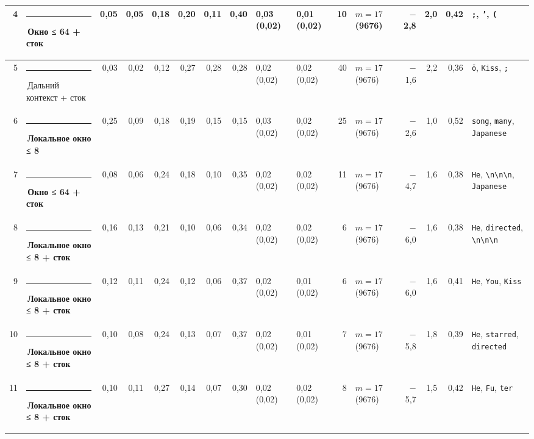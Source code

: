 \documentclass[10pt]{article}
\begin{document}
\begin{minipage}{\linewidth}
\begin{center}
{\begin{tabular}{|r|l|r|r|r|r|r|r|l|l|r|l|r|r|r|l|}
4 & \textcolor[HTML]{EDA100}{\rule{0.62em}{0.62em}}\,\textbf{Окно ≤ 64 + сток} & 0,05 & 0,05 & 0,18 & 0,20 & 0,11 & 0,40 & 0,03 (0,02) & 0,01 (0,02) & 10 & $m{=}17$ (9676) & $-$2,8 & 2,0 & 0,42 & \texttt{\textvisiblespace{};}, \texttt{\textvisiblespace{}'}, \texttt{\textvisiblespace{}(} \\ \hline
5 & \textcolor[HTML]{C3C2B7}{\rule{0.62em}{0.62em}}\,Дальний контекст + сток & 0,03 & 0,02 & 0,12 & 0,27 & 0,28 & 0,28 & 0,02 (0,02) & 0,02 (0,02) & 40 & $m{=}17$ (9676) & $-$1,6 & 2,2 & 0,36 & \texttt{ō}, \texttt{\textvisiblespace{}Kiss}, \texttt{\textvisiblespace{};} \\ \hline
6 & \textcolor[HTML]{1BAF7A}{\rule{0.62em}{0.62em}}\,\textbf{Локальное окно ≤ 8} & 0,25 & 0,09 & 0,18 & 0,19 & 0,15 & 0,15 & 0,03 (0,02) & 0,02 (0,02) & 25 & $m{=}17$ (9676) & $-$2,6 & 1,0 & 0,52 & \texttt{\textvisiblespace{}song}, \texttt{\textvisiblespace{}many}, \texttt{\textvisiblespace{}Japanese} \\ \hline
7 & \textcolor[HTML]{EDA100}{\rule{0.62em}{0.62em}}\,\textbf{Окно ≤ 64 + сток} & 0,08 & 0,06 & 0,24 & 0,18 & 0,10 & 0,35 & 0,02 (0,02) & 0,02 (0,02) & 11 & $m{=}17$ (9676) & $-$4,7 & 1,6 & 0,38 & \texttt{\textvisiblespace{}He}, \texttt{\textvisiblespace{}\textbackslash{}n\textbackslash{}n\textbackslash{}n}, \texttt{\textvisiblespace{}Japanese} \\ \hline
8 & \textcolor[HTML]{1BAF7A}{\rule{0.62em}{0.62em}}\,\textbf{Локальное окно ≤ 8 + сток} & 0,16 & 0,13 & 0,21 & 0,10 & 0,06 & 0,34 & 0,02 (0,02) & 0,02 (0,02) & 6 & $m{=}17$ (9676) & $-$6,0 & 1,6 & 0,38 & \texttt{\textvisiblespace{}He}, \texttt{\textvisiblespace{}directed}, \texttt{\textvisiblespace{}\textbackslash{}n\textbackslash{}n\textbackslash{}n} \\ \hline
9 & \textcolor[HTML]{1BAF7A}{\rule{0.62em}{0.62em}}\,\textbf{Локальное окно ≤ 8 + сток} & 0,12 & 0,11 & 0,24 & 0,12 & 0,06 & 0,37 & 0,02 (0,02) & 0,01 (0,02) & 6 & $m{=}17$ (9676) & $-$6,0 & 1,6 & 0,41 & \texttt{\textvisiblespace{}He}, \texttt{\textvisiblespace{}You}, \texttt{\textvisiblespace{}Kiss} \\ \hline
10 & \textcolor[HTML]{1BAF7A}{\rule{0.62em}{0.62em}}\,\textbf{Локальное окно ≤ 8 + сток} & 0,10 & 0,08 & 0,24 & 0,13 & 0,07 & 0,37 & 0,02 (0,02) & 0,01 (0,02) & 7 & $m{=}17$ (9676) & $-$5,8 & 1,8 & 0,39 & \texttt{\textvisiblespace{}He}, \texttt{\textvisiblespace{}starred}, \texttt{\textvisiblespace{}directed} \\ \hline
11 & \textcolor[HTML]{1BAF7A}{\rule{0.62em}{0.62em}}\,\textbf{Локальное окно ≤ 8 + сток} & 0,10 & 0,11 & 0,27 & 0,14 & 0,07 & 0,30 & 0,02 (0,02) & 0,02 (0,02) & 8 & $m{=}17$ (9676) & $-$5,7 & 1,5 & 0,42 & \texttt{\textvisiblespace{}He}, \texttt{\textvisiblespace{}Fu}, \texttt{ter} \\ \hline

\end{tabular}}
\end{center}
\end{minipage}
\end{document}
